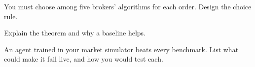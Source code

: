 \begin{interviewq}\label{iq:ml:reinforcement-learning-foundations:4}
You must choose among five brokers' algorithms for each order. Design the choice rule.
\end{interviewq}

\begin{interviewq}\label{iq:ml:reinforcement-learning-foundations:5}
Explain the  theorem and why a baseline helps.
\end{interviewq}

\begin{interviewq}\label{iq:ml:reinforcement-learning-foundations:6}
An agent trained in your market simulator beats every benchmark. List what could make it fail live, and how you would test
each.
\end{interviewq}
